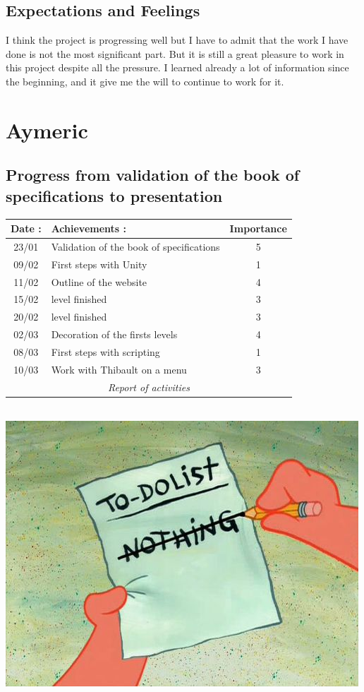 		\subsection{Expectations and Feelings}
			I think the project is progressing well but I have to admit that the work I have done is not the most significant part.
			But it is still a great pleasure to work in this project despite all the pressure.
			I learned already a lot of information since the beginning, and it give me the will to continue to work for it.

	\section{Aymeric}
		\subsection{Progress from validation of the book of specifications to  presentation}
			\begin{tabular}{|c|l|c|}
				\hline \cellcolor{gray}Date :	& \cellcolor{gray}Achievements :		& \cellcolor{gray}Importance	\\
				\hline 23/01			& Validation of the book of specifications	& \cellcolor{red}5		\\
				\hline 09/02			& First steps with Unity			& 1				\\
				\hline 11/02			& Outline of the website			& \cellcolor{orange}4		\\
				\hline 15/02			& \nth{1} level finished			& \cellcolor{green}3		\\
				\hline 20/02			& \nth{2} level finished			& \cellcolor{green}3		\\
				\hline 02/03			& Decoration of the firsts levels		& \cellcolor{orange}4		\\
				\hline 08/03			& First steps with scripting			& 1				\\
				\hline 10/03			& Work with Thibault on a menu			& \cellcolor{green}3		\\
				\hline \multicolumn{3}{c}{\textit{Report of activities}}
			\end{tabular}
			\ \ \hfill\ \includegraphics[scale=0.3]{img_aym1.png}

